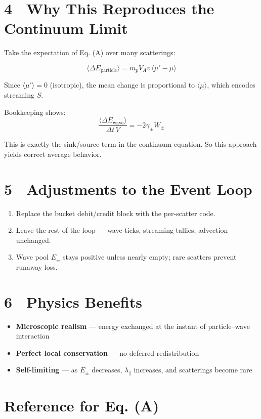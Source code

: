 {\section*{4 Why This Reproduces the Continuum Limit}

Take the expectation of Eq. (A) over many scatterings:

\[
\langle \Delta E_{\text{particle}} \rangle
= m_p V_A v\, \langle \mu' - \mu \rangle
\]

Since $\langle \mu' \rangle = 0$ (isotropic), the mean change is proportional to $\langle \mu \rangle$, which encodes streaming $S$.

Bookkeeping shows:
\[
\frac{ \langle \Delta E_{\text{wave}} \rangle }{ \Delta t\,V }
= -2 \gamma_\pm W_\pm
\]

This is exactly the sink/source term in the continuum equation. So this approach yields correct average behavior.

\section*{5 Adjustments to the Event Loop}

\begin{enumerate}
  \item Replace the bucket debit/credit block with the per-scatter code.
  \item Leave the rest of the loop — wave ticks, streaming tallies, advection — unchanged.
  \item Wave pool $E_\pm$ stays positive unless nearly empty; rare scatters prevent runaway loss.
\end{enumerate}

\section*{6 Physics Benefits}

\begin{itemize}
  \item \textbf{Microscopic realism} — energy exchanged at the instant of particle–wave interaction
  \item \textbf{Perfect local conservation} — no deferred redistribution
  \item \textbf{Self-limiting} — as $E_\pm$ decreases, $\lambda_\parallel$ increases, and scatterings become rare
\end{itemize}

\section*{Reference for Eq. (A)}

}
